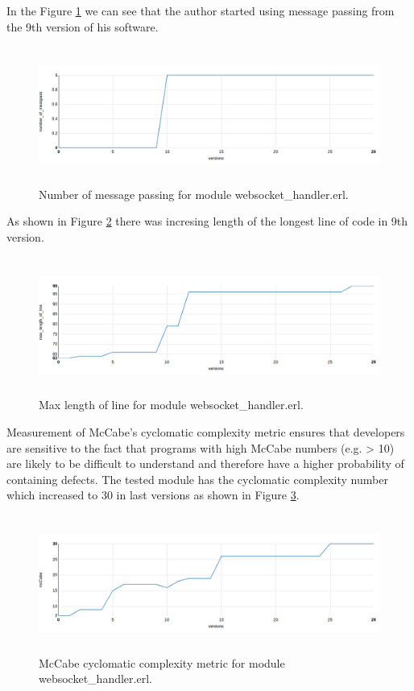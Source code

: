 In the Figure \ref{fig:chat} we can see that the author started using message passing from the 9th version of his software.

\begin{figure}[h]
	\centering
	\includegraphics[height=45mm]{figures/chat.png}
	\caption{Number of message passing for module websocket\_handler.erl.}
	\label{fig:chat}
\end{figure}

As shown in Figure \ref{fig:chat5} there was incresing length of the longest line of code in 9th version. 
\begin{figure}[h]
	\centering
	\includegraphics[height=45mm]{figures/chat5.png}
	\caption{Max length of line for module websocket\_handler.erl.}
	\label{fig:chat5}
\end{figure}

Measurement of McCabe’s cyclomatic complexity metric ensures that developers are sensitive to the fact that programs with high McCabe numbers (e.g. > 10) are likely to be difficult to understand and therefore have a higher probability of containing defects. 
The tested module has the cyclomatic complexity number which increased to 30 in last versions as shown in Figure \ref{fig:mcCabe}.

\begin{figure}[h]
	\centering
	\includegraphics[height=45mm]{figures/mcCabe.png}
	\caption{
	McCabe cyclomatic complexity metric for module websocket\_handler.erl.}
	\label{fig:mcCabe}
\end{figure}

